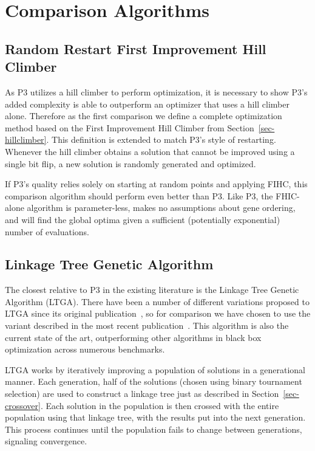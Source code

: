\documentclass{sig-alternate}
\begin{document}


\section{Comparison Algorithms}

\subsection{Random Restart First Improvement Hill Climber}

As P3 utilizes a hill climber to perform optimization, it is necessary
to show P3's added complexity is able to outperform an optimizer that
uses a hill climber alone.  Therefore as the first comparison we
define a complete optimization method based on the First Improvement
Hill Climber from Section~\ref{sec-hillclimber}.  This
definition is extended to match P3's style of restarting. Whenever the
hill climber obtains a solution that cannot be improved using a single
bit flip, a new solution is randomly generated and optimized.

If P3's quality relies solely on starting at random points and
applying FIHC, this comparison algorithm should perform even better
than P3.  Like P3, the FHIC-alone algorithm is parameter-less, makes no
assumptions about gene ordering, and will find the global optima given
a sufficient (potentially exponential) number of evaluations.

\subsection{Linkage Tree Genetic Algorithm}
\label{sec-ltga}
The closest relative to P3 in the existing literature is the Linkage Tree Genetic Algorithm
(LTGA).  There have been a number of different variations proposed to LTGA since
its original publication~\cite{thierens:2010:ltga}, so for comparison we have chosen
to use the variant described in the most recent publication~\cite{thierens:2013:ltgahiff}.
This algorithm is also the current state of the art, outperforming other algorithms
in black box optimization across numerous benchmarks.

LTGA works by iteratively improving a population of solutions in a generational manner.
Each generation, half of the solutions (chosen using binary tournament selection)
are used to construct a linkage tree just as described in Section~\ref{sec-crossover}.
Each solution in the population is then crossed with the entire population using that
linkage tree, with the results put into the next generation.  This process continues
until the population fails to change between generations, signaling convergence.
\end{document}
